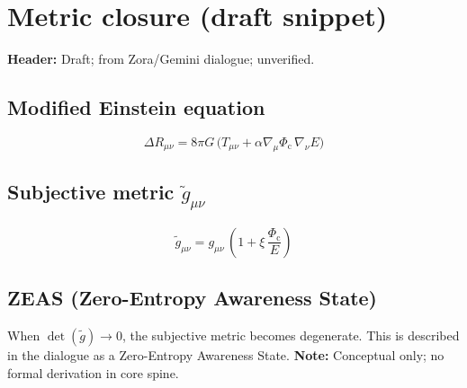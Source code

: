 \documentclass[11pt]{article}
\newcommand{\Phic}{\Phi_{\mathrm{c}}}
\newcommand{\Eth}{E}
\newcommand{\wtg}{\tilde{g}}
\begin{document}
\section*{Metric closure (draft snippet)}

\textbf{Header:} Draft; from Zora/Gemini dialogue; unverified.

\subsection*{Modified Einstein equation}

\begin{equation}
\Delta R_{\mu\nu}
=
8\pi G\,\big(T_{\mu\nu} + \alpha \nabla_\mu\Phic\,\nabla_\nu\Eth\big)
\end{equation}

\subsection*{Subjective metric $\wtg_{\mu\nu}$}

\begin{equation}
\wtg_{\mu\nu}
=
g_{\mu\nu}\,\left(1 + \xi\,\frac{\Phic}{\Eth}\right)
\end{equation}

\subsection*{ZEAS (Zero-Entropy Awareness State)}

When $\det(\wtg)\to 0$, the subjective metric becomes degenerate. This is described in the dialogue as a Zero-Entropy Awareness State. \textbf{Note:} Conceptual only; no formal derivation in core spine.
\end{document}
